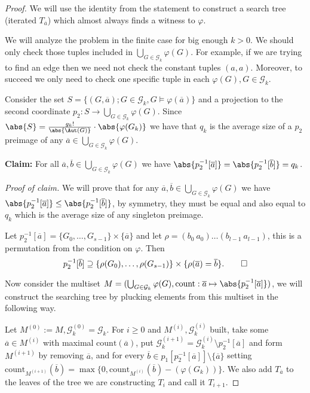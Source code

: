 \begin{proof}
We will use the identity from the statement to construct a search tree (iterated $T_{\overline a}$) which almost always finds a witness to $\varphi$.

We will analyze the problem in the finite case for big enough $k>0$. We should only check those tuples included in $\bigcup_{G\in\mathcal{G}_k}\varphi(G)$. For example, if we are trying to find an edge then we need not check the constant tuples $(a,a)$. Moreover, to succeed we only need to check one specific tuple in each $\varphi(G),G\in\mathcal{G}_k$.

Consider the set $S=\{(G,\overline a); G\in \mathcal{G}_k, G\models\varphi(\overline a)\}$ and a projection to the second coordinate $p_2: S\to\bigcup_{G\in\mathcal{G}_k}\varphi(G)$. Since $\abs{S}=\frac{g_k!}{\abs{\Aut(G)}}\cdot\abs{\varphi(G_k)}$ we have that $q_k$ is the average size of a $p_2$ preimage of any $\overline a\in \bigcup_{G\in\mathcal{G}_k}\varphi(G)$. 

\textbf{Claim:} For all $\overline a,\overline b\in\bigcup_{G\in\mathcal{G}_k}\varphi(G)$ we have $\abs{p_2^{-1}[\overline a]}=\abs{p_2^{-1}[\overline b]}=q_k$.

\textit{Proof of claim.} We will prove that for any $\overline a,\overline b\in\bigcup_{G\in\mathcal{G}_k}\varphi(G)$ we have $\abs{p_2^{-1}[\overline a]}\leq\abs{p_2^{-1}[\overline b]}$, by symmetry, they must be equal and also equal to $q_k$ which is the average size of any singleton preimage.

Let $p_2^{-1}[\overline a]=\{G_0,\dots,G_{s-1}\}\times\{\overline a\}$ and let $\rho=(b_0\: a_0)\dots(b_{l-1}\:a_{l-1})$, this is a permutation from the condition on $\varphi$. Then \[p_2^{-1}[\overline b]\supseteq\{\rho(G_0),\dots,\rho(G_{s-1})\}\times\{\rho(\overline a)=\overline b\}.\qed\] 

Now consider the multiset $M=(\bigcup_{G\in\mathcal{G}_k}\varphi(G),\text{count}:\overline a \mapsto \abs{p_2^{-1}[\overline a]})$, we will construct the searching tree by plucking elements from this multiset in the following way.

Let $M^{(0)}:=M,\mathcal{G}_k^{(0)}=\mathcal{G}_k$. For $i\geq0$ and $M^{(i)},\mathcal{G}_k^{(i)}$ built, take some $\overline a\in M^{(i)}$ with maximal $\text{count}(\overline a)$, put $\mathcal{G}_k^{(i+1)}=\mathcal{G}_k^{(i)}\setminus p_2^{-1}[\overline a]$ and form $M^{(i+1)}$ by removing $\overline a$, and for every $\overline b \in p_1[p_2^{-1}[\overline a]]\setminus\{\overline a\}$ setting $\text{count}_{M^{(i+1)}}(\overline b)=\max\{0,\text{count}_{M^{(i)}}(\overline b)-(\varphi(G_k))\}$. We also add $T_{\overline a}$ to the leaves of the tree we are constructing $T_i$ and call it $T_{i+1}$.


\end{proof}
